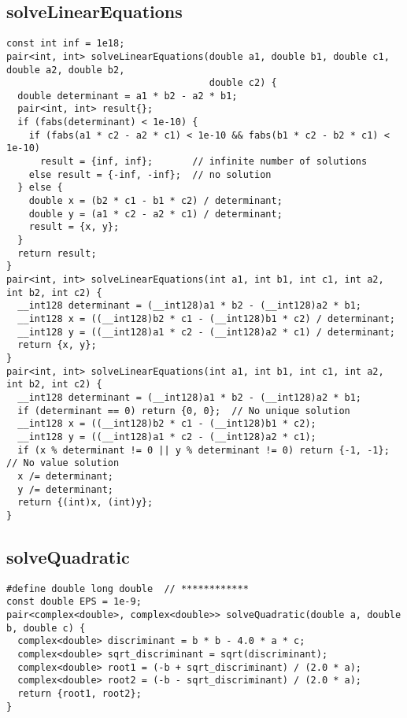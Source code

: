 \documentclass[twoside]{article}
\begin{document}
\begin{multicols*}{2}
{\subsection*{solveLinearEquations}
}
\begin{verbatim}
const int inf = 1e18;
pair<int, int> solveLinearEquations(double a1, double b1, double c1, double a2, double b2,
                                    double c2) {
  double determinant = a1 * b2 - a2 * b1;
  pair<int, int> result{};
  if (fabs(determinant) < 1e-10) {
    if (fabs(a1 * c2 - a2 * c1) < 1e-10 && fabs(b1 * c2 - b2 * c1) < 1e-10)
      result = {inf, inf};       // infinite number of solutions
    else result = {-inf, -inf};  // no solution
  } else {
    double x = (b2 * c1 - b1 * c2) / determinant;
    double y = (a1 * c2 - a2 * c1) / determinant;
    result = {x, y};
  }
  return result;
}
pair<int, int> solveLinearEquations(int a1, int b1, int c1, int a2, int b2, int c2) {
  __int128 determinant = (__int128)a1 * b2 - (__int128)a2 * b1;
  __int128 x = ((__int128)b2 * c1 - (__int128)b1 * c2) / determinant;
  __int128 y = ((__int128)a1 * c2 - (__int128)a2 * c1) / determinant;
  return {x, y};
}
pair<int, int> solveLinearEquations(int a1, int b1, int c1, int a2, int b2, int c2) {
  __int128 determinant = (__int128)a1 * b2 - (__int128)a2 * b1;
  if (determinant == 0) return {0, 0};  // No unique solution
  __int128 x = ((__int128)b2 * c1 - (__int128)b1 * c2);
  __int128 y = ((__int128)a1 * c2 - (__int128)a2 * c1);
  if (x % determinant != 0 || y % determinant != 0) return {-1, -1};  // No value solution
  x /= determinant;
  y /= determinant;
  return {(int)x, (int)y};
}
\end{verbatim}

{
\subsection*{solveQuadratic}
}
\begin{verbatim}
#define double long double  // ************
const double EPS = 1e-9;
pair<complex<double>, complex<double>> solveQuadratic(double a, double b, double c) {
  complex<double> discriminant = b * b - 4.0 * a * c;
  complex<double> sqrt_discriminant = sqrt(discriminant);
  complex<double> root1 = (-b + sqrt_discriminant) / (2.0 * a);
  complex<double> root2 = (-b - sqrt_discriminant) / (2.0 * a);
  return {root1, root2};
}
\end{verbatim}


\end{multicols*}
\end{document}
